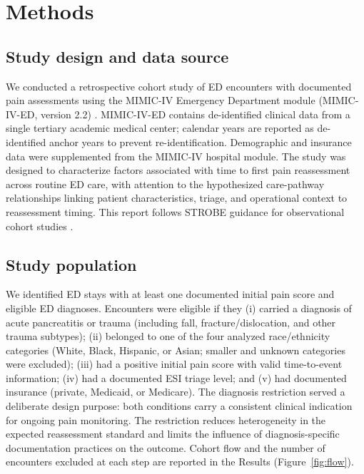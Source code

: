 \documentclass[11pt]{article}
\begin{document}
\section{Methods}
\label{sec:methods}

\subsection{Study design and data source}

We conducted a retrospective cohort study of ED encounters with documented pain assessments using the MIMIC-IV Emergency Department module (MIMIC-IV-ED, version 2.2) \citep{Johnson2023MIMICIVED}.
MIMIC-IV-ED contains de-identified clinical data from a single tertiary academic medical center; calendar years are reported as de-identified anchor years to prevent re-identification.
Demographic and insurance data were supplemented from the MIMIC-IV hospital module.
The study was designed to characterize factors associated with time to first pain reassessment across routine ED care, with attention to the hypothesized care-pathway relationships linking patient characteristics, triage, and operational context to reassessment timing.
This report follows STROBE guidance for observational cohort studies \citep{vonElm2007STROBE}.

\subsection{Study population}

We identified ED stays with at least one documented initial pain score and eligible ED diagnoses.
Encounters were eligible if they (i) carried a diagnosis of acute pancreatitis or trauma (including fall, fracture/dislocation, and other trauma subtypes); (ii) belonged to one of the four analyzed race/ethnicity categories (White, Black, Hispanic, or Asian; smaller and unknown categories were excluded); (iii) had a positive initial pain score with valid time-to-event information; (iv) had a documented ESI triage level; and (v) had documented insurance (private, Medicaid, or Medicare).
The diagnosis restriction served a deliberate design purpose: both conditions carry a consistent clinical indication for ongoing pain monitoring.
The restriction reduces heterogeneity in the expected reassessment standard and limits the influence of diagnosis-specific documentation practices on the outcome.
Cohort flow and the number of encounters excluded at each step are reported in the Results (Figure~\ref{fig:flow}).
\end{document}
